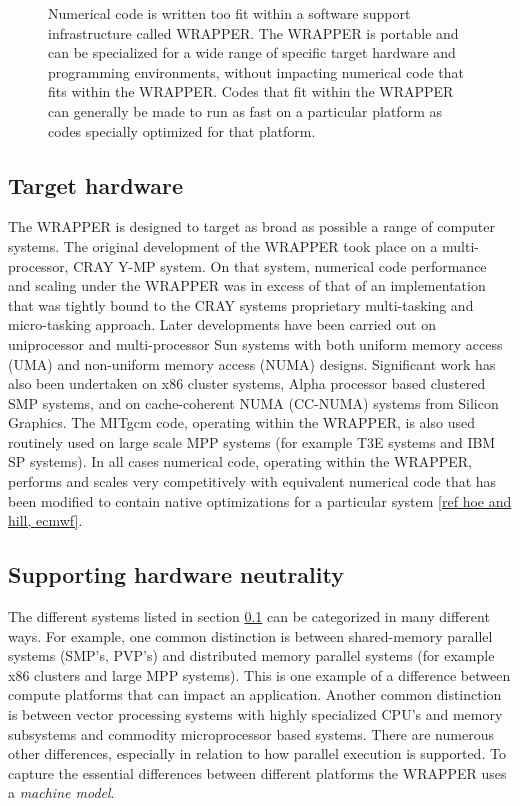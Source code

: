 \begin{figure}
\begin{center}
\end{center}
\caption{
Numerical code is written too fit within a software support
infrastructure called WRAPPER. The WRAPPER is portable and
can be specialized for a wide range of specific target hardware and 
programming environments, without impacting numerical code that fits
within the WRAPPER. Codes that fit within the WRAPPER can generally be
made to run as fast on a particular platform as codes specially 
optimized for that platform.}
\label{fig:fit_in_wrapper}
\end{figure}

\subsection{Target hardware}
\label{sec:target_hardware}

The WRAPPER is designed to target as broad as possible a range of computer
systems. The original development of the WRAPPER took place on a 
multi-processor, CRAY Y-MP system. On that system, numerical code performance 
and scaling under the WRAPPER was in excess of that of an implementation that 
was tightly bound to the CRAY systems proprietary multi-tasking and 
micro-tasking approach. Later developments have been carried out on 
uniprocessor and multi-processor Sun systems with both uniform memory access 
(UMA) and non-uniform memory access (NUMA) designs. Significant work has also 
been undertaken on x86 cluster systems, Alpha processor based clustered SMP 
systems, and on cache-coherent NUMA (CC-NUMA) systems from Silicon Graphics. 
The MITgcm code, operating within the WRAPPER, is also used routinely used on 
large scale MPP systems (for example T3E systems and IBM SP systems). In all 
cases numerical code, operating within the WRAPPER, performs and scales very 
competitively with equivalent numerical code that has been modified to contain 
native optimizations for a particular system \ref{ref hoe and hill, ecmwf}.

\subsection{Supporting hardware neutrality}

The different systems listed in section \ref{sec:target_hardware} can be 
categorized in many different ways. For example, one common distinction is 
between shared-memory parallel systems (SMP's, PVP's) and distributed memory 
parallel systems (for example x86 clusters and large MPP systems). This is one 
example of a difference between compute platforms that can impact an 
application. Another common distinction is between vector processing systems 
with highly specialized CPU's and memory subsystems and commodity 
microprocessor based systems. There are numerous other differences, especially 
in relation to how parallel execution is supported. To capture the essential 
differences between different platforms the WRAPPER uses a {\it machine model}. 

